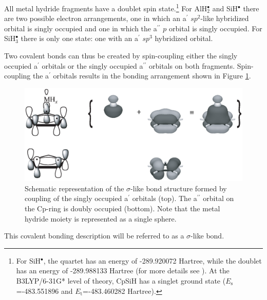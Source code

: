 All metal hydride fragments have a doublet spin state.\footnote{For SiH$^\bullet$, the quartet has an energy of \mbox{-289.920072} Hartree, while the doublet has an energy of \mbox{-289.988133} Hartree (for more details see \cite{kalemos}). At the B3LYP/6-31G* level of theory, CpSiH has a singlet ground state ($E_\mathrm{s}$=\mbox{-483.551896} and $E_\mathrm{t}$=\mbox{-483.460282} Hartree).} For AlH$_2^\bullet$ and SiH$^\bullet$ there are two possible electron arrangements, one in which an a$^\prime$ $sp^2$-like hybridized orbital is singly occupied and one in which the a$^{\prime\prime}$ $p$ orbital is singly occupied. For SiH$_3^\bullet$ there is only one state: one with an a$^\prime$ $sp^3$ hybridized orbital. 

Two covalent bonds can thus be created by spin-coupling either the singly occupied a$^\prime$ orbitals or the singly occupied a$^{\prime\prime}$ orbitals on both fragments. Spin-coupling the a$^\prime$ orbitals results in the bonding arrangement shown in Figure \ref{ch4.fig.sigma}.
\begin{figure}[htbp]
\center
\includegraphics[scale=0.45]{cyclopentadienyl/figures/sigma.eps}
\caption{Schematic representation of the $\sigma$-like bond structure formed by coupling of the singly occupied a$^\prime$ orbitals (top). The a$^{\prime\prime}$ orbital on the Cp-ring is doubly occupied (bottom). Note that the metal hydride moiety is represented as a single sphere.}
\label{ch4.fig.sigma}
\end{figure}
This covalent bonding description will be referred to as a $\sigma$-like bond.

